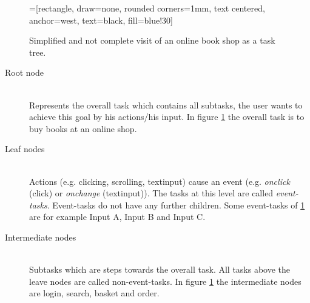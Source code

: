 \begin{figure}
	=[rectangle, draw=none, rounded corners=1mm,
        text centered, anchor=west, text=black, fill=blue!30]

	\caption{Simplified and not complete visit of an online book shop as a task tree.}
	\label{fig:booktree}
\end{figure}
\begin{description}
	\item[Root node]\hfill\\ Represents the overall task which contains all subtasks, the user wants to achieve this goal by his actions/his input. In figure \ref{fig:booktree} the overall task is to buy books at an online shop.
	\item[Leaf nodes]\hfill\\ Actions (e.g. clicking, scrolling, textinput) cause an event (e.g. \textit{onclick} (click) or \textit{onchange} (textinput)). The tasks at this level are called \textit{event-tasks}. Event-tasks do not have any further children. Some event-tasks of \ref{fig:booktree} are for example Input A, Input B and Input C.
	\item[Intermediate nodes]\hfill\\ Subtasks which are steps towards the overall task. All tasks above the leave nodes are called non-event-tasks. In figure \ref{fig:booktree} the intermediate nodes are login, search, basket and order.
\end{description}

